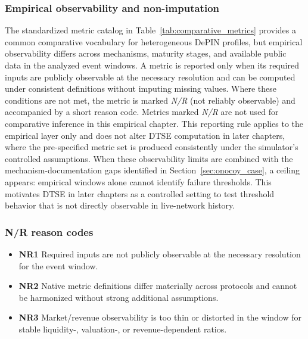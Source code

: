 \subsubsection{Empirical observability and non-imputation}
The standardized metric catalog in Table~\ref{tab:comparative_metrics} provides a common comparative vocabulary for heterogeneous DePIN profiles, but empirical observability differs across mechanisms, maturity stages, and available public data in the analyzed event windows. A metric is reported only when its required inputs are publicly observable at the necessary resolution and can be computed under consistent definitions without imputing missing values. Where these conditions are not met, the metric is marked \emph{N/R} (not reliably observable) and accompanied by a short reason code. Metrics marked \emph{N/R} are not used for comparative inference in this empirical chapter. This reporting rule applies to the empirical layer only and does not alter DTSE computation in later chapters, where the pre-specified metric set is produced consistently under the simulator's controlled assumptions.
When these observability limits are combined with the mechanism-documentation gaps identified in Section~\ref{sec:onocoy_case}, a ceiling appears: empirical windows alone cannot identify failure thresholds. This motivates DTSE in later chapters as a controlled setting to test threshold behavior that is not directly observable in live-network history.

\subsubsection{N/R reason codes}
\begin{itemize}
    \item \textbf{NR1} Required inputs are not publicly observable at the necessary resolution for the event window.
    \item \textbf{NR2} Native metric definitions differ materially across protocols and cannot be harmonized without strong additional assumptions.
    \item \textbf{NR3} Market/revenue observability is too thin or distorted in the window for stable liquidity-, valuation-, or revenue-dependent ratios.
\end{itemize}

